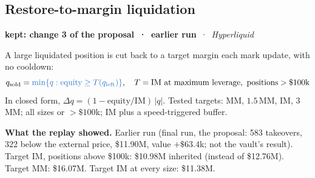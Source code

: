 \documentclass[10.5pt,a4paper]{article}
\newcommand{\chg}[1]{\ensuremath{{\color[HTML]{2F74D0}#1}}}
\newcommand{\st}[3]{\textcolor{#1}{\textbf{#2}} \,·\, \emph{#3}\par}
\newcommand{\res}[1]{\par\textbf{What the replay showed.} #1\par}
\begin{document}
\subsection{Restore-to-margin liquidation}\label{var:auto14}
\st{lead}{kept: change 3 of the proposal \,·\, earlier run}{Hyperliquid}
A large liquidated position is cut back to a target margin each mark update, with no cooldown:
\begin{equation}
q_{\text{sold}} = \chg{\min\{q : \text{equity} \ge T(q_{\text{left}})\}},\quad T = \text{IM at maximum leverage},\ \text{positions} > \$100\text{k}
\end{equation}
In closed form, $\Delta q = (1 - \text{equity}/\text{IM})\,|q|$.
Tested targets: MM, $1.5$\,MM, IM, $3$\,MM; all sizes or $>\$100$k; IM plus a speed-triggered buffer.
\res{Earlier run (final run, the proposal: 583 takeovers, 322 below the external price, \$11.90M, value $+\$63.4$k; not the vault's result). Target IM, positions above \$100k: \$10.98M inherited (instead of \$12.76M). Target MM: \$16.07M. Target IM at every size: \$11.38M.}
\end{document}
